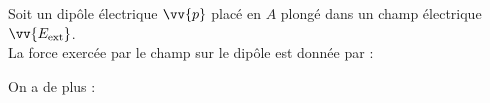 ﻿\documentclass[a4paper]{article}
\begin{document}
\pagestyle{fancy}
\fancyhf{}
\setlength{\headheight}{15pt}

\begin{center}
	\large{}
\end{center}


Soit un dipôle électrique \(\vv{p}\) placé en \(A\) plongé dans un champ électrique \(\vv{E_{\mathrm{ext}}}\).\\
La force exercée par le champ sur le dipôle est donnée par :\begin{center}\end{center}
On a de plus :\begin{center}\end{center}
\end{document}
